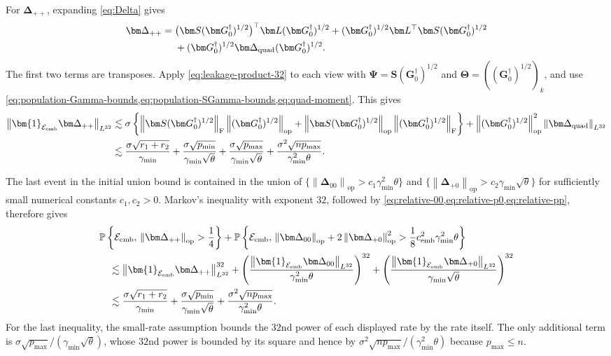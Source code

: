 \documentclass[11pt]{article}
\newcommand{\Pp}{\mathbb{P}}
\newcommand{\ind}{\bm{1}}
\newcommand{\trans}{\top}
\newcommand{\opn}[1]{\left\lVert #1\right\rVert_{\mathrm{op}}}
\newcommand{\frn}[1]{\left\lVert #1\right\rVert_{\mathrm{F}}}
\newcommand{\Lqn}[2]{\left\lVert #1\right\rVert_{L^{#2}}}
\newcommand{\cE}{\mathcal{E}}
\newcommand{\gmin}{\gamma_{\min}}
\newcommand{\cemb}{c_{\mathrm{emb}}}
\begin{document}
For $\bm\Delta_{++}$, expanding \cref{eq:Delta} gives
\[
\begin{aligned}
  \bm\Delta_{++}
  ={}&
  \bigl(\bm S(\bm G_0^\dagger)^{1/2}\bigr)^\trans
  \bm L(\bm G_0^\dagger)^{1/2}
  +
  (\bm G_0^\dagger)^{1/2}\bm L^\trans
  \bm S(\bm G_0^\dagger)^{1/2} \\
  &+
  (\bm G_0^\dagger)^{1/2}
  \bm\Delta_{\rm quad}
  (\bm G_0^\dagger)^{1/2}.
\end{aligned}
\]
The first two terms are transposes. Apply
\cref{eq:leakage-product-32} to each view with
$\bm\Psi=\bm S(\bm G_0^\dagger)^{1/2}$ and
$\bm\Theta=((\bm G_0^\dagger)^{1/2})_k$, and use
\cref{eq:population-Gamma-bounds,eq:population-SGamma-bounds,eq:quad-moment}.
This gives
\begin{equation}
\label{eq:relative-pp}
\begin{aligned}
  \Lqn{
    \ind_{\cE_{\rm emb}}\bm\Delta_{++}
  }{32}
  &\lesssim
  \sigma
  \left\{
    \frn{\bm S(\bm G_0^\dagger)^{1/2}}
    \opn{(\bm G_0^\dagger)^{1/2}}
    +
    \opn{\bm S(\bm G_0^\dagger)^{1/2}}
    \frn{(\bm G_0^\dagger)^{1/2}}
  \right\}
  +
  \opn{(\bm G_0^\dagger)^{1/2}}^2
  \Lqn{\bm\Delta_{\rm quad}}{32} \\
  &\lesssim
  \frac{\sigma\sqrt{r_1+r_2}}{\gmin}
  +
  \frac{\sigma\sqrt{p_{\min}}}{\gmin\sqrt\theta}
  +
  \frac{\sigma\sqrt{p_{\max}}}{\gmin\sqrt\theta}
  +
  \frac{\sigma^2\sqrt{np_{\max}}}{\gmin^2\theta}.
\end{aligned}
\end{equation}

The last event in the initial union bound is contained in the union of
$\{\opn{\bm\Delta_{00}}>c_1\gmin^2\theta\}$ and
$\{\opn{\bm\Delta_{+0}}>c_2\gmin\sqrt\theta\}$ for sufficiently small
numerical constants $c_1,c_2>0$. Markov's inequality with exponent $32$,
followed by
\cref{eq:relative-00,eq:relative-p0,eq:relative-pp}, therefore gives
\begin{align}
\label{eq:relative-failure}
  &\Pp\left\{
    \cE_{\rm emb},\,
    \opn{\bm\Delta_{++}}>\frac14
  \right\}
  +
  \Pp\left\{
    \cE_{\rm emb},\,
    \opn{\bm\Delta_{00}}
    +2\opn{\bm\Delta_{+0}}^2
    >
    \frac18\cemb^2\gmin^2\theta
  \right\}
  \notag\\
  &\quad\lesssim
  \Lqn{
    \ind_{\cE_{\rm emb}}\bm\Delta_{++}
  }{32}^{32}
  +
  \left(
    \frac{
      \Lqn{\ind_{\cE_{\rm emb}}\bm\Delta_{00}}{32}
    }{\gmin^2\theta}
  \right)^{32}
  +
  \left(
    \frac{
      \Lqn{\ind_{\cE_{\rm emb}}\bm\Delta_{+0}}{32}
    }{\gmin\sqrt\theta}
  \right)^{32}
  \notag\\
  &\quad\lesssim
  \frac{\sigma\sqrt{r_1+r_2}}{\gmin}
  +
  \frac{\sigma\sqrt{p_{\min}}}{\gmin\sqrt\theta}
  +
  \frac{\sigma^2\sqrt{np_{\max}}}{\gmin^2\theta}.
\end{align}
For the last inequality, the small-rate assumption bounds the $32$nd power
of each displayed rate by the rate itself. The only additional term is
$\sigma\sqrt{p_{\max}}/(\gmin\sqrt\theta)$, whose $32$nd power is bounded by
its square and hence by
$\sigma^2\sqrt{np_{\max}}/(\gmin^2\theta)$ because $p_{\max}\le n$.
\end{document}
